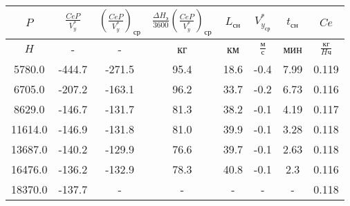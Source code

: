 \begin{tabular}{|c|c|c|c|c|c|c|c|}
\hline
$P$ & $\frac{CeP}{V_y^*}$ & $(\frac{CeP}{V_y^*})_{ср}$ & $\frac{\Delta H_э}{3600}(\frac{CeP}{V_y^*})_{ср}$ & $L_{сн}$ & $V_{y_{ср}}^*$ & $t_{сн}$ & $Ce$ \\ 
\hline
$H$ & - & - & кг & км & $\frac{м}{с}$ & мин & $\frac{кг}{H ч}$ \\ 
\hline
5780.0 & -444.7 & -271.5 & 95.4 & 18.6 & -0.4 & 7.99 & 0.119 \\ 
\hline
6705.0 & -207.2 & -163.1 & 96.2 & 33.7 & -0.2 & 6.73 & 0.116 \\ 
\hline
8629.0 & -146.7 & -131.7 & 81.3 & 38.2 & -0.1 & 4.19 & 0.117 \\ 
\hline
11614.0 & -146.9 & -131.8 & 81.0 & 39.9 & -0.1 & 3.28 & 0.118 \\ 
\hline
13687.0 & -140.2 & -129.9 & 76.6 & 39.7 & -0.1 & 2.63 & 0.118 \\ 
\hline
16476.0 & -136.2 & -132.9 & 78.3 & 40.8 & -0.1 & 2.3 & 0.116 \\ 
\hline
18370.0 & -137.7 & - & - & - & - & - & 0.118 \\ 
\hline
\end{tabular}